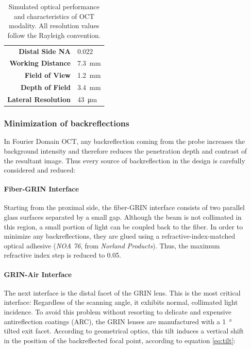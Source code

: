 \begin{table}\centering
	\begin{tabular}{rl}\\
		\hline
		\textbf{Distal Side NA} & 0.022 \\ 
		\textbf{Working Distance} & \SI{7.3}{\milli\meter} \\ 
		\textbf{Field of View} & \SI{1.2}{\milli\meter} \\ 
		\textbf{Depth of Field} & \SI{3.4}{\milli\meter} \\ 
		\textbf{Lateral Resolution} & \SI{43}{\micro\meter} \\ 
		\hline
	\end{tabular} 
    \caption{Simulated optical performance and characteristics of OCT modality. All resolution values follow the Rayleigh convention.}
    \label{tab:simRes}
\end{table}


\subsubsection{Minimization of backreflections}
In Fourier Domain OCT, any backreflection coming from the probe increases the background intensity and therefore reduces the penetration depth and contrast of the resultant image. Thus every source of backreflection in the design is carefully considered and reduced:

\paragraph{Fiber-GRIN Interface}
Starting from the proximal side, the fiber-GRIN interface consists of two parallel glass surfaces separated by a small gap. Although the beam is not collimated in this region, a small portion of light can be coupled back to the fiber. In order to minimize any backreflections, they are glued using a refractive-index-matched optical adhesive (\textit{NOA 76}, from \textit{Norland Products}). Thus, the maximum refractive index step is reduced to \SI{0.05}{}.

\paragraph{GRIN-Air Interface} The next interface is the distal facet of the GRIN lens. This is the most critical interface: Regardless of the scanning angle, it exhibits normal, collimated light incidence. To avoid this problem without resorting to delicate and expensive antireflection coatings (ARC), the GRIN lenses are manufactured with a \SI{1}{\degree} tilted exit facet. According to geometrical optics, this tilt induces a vertical shift in the position of the backreflected focal point, according to equation \ref{eq:tilt}:

